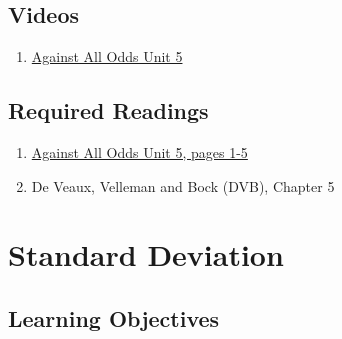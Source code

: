 \documentclass[letterpaper,12pt,twoside,printwatermark=false]{pinp}
\providecommand{\tightlist}{%
  \setlength{\itemsep}{0pt}\setlength{\parskip}{0pt}}
\begin{document}
\hypertarget{videos}{%
\subsection{Videos}\label{videos}}

\begin{enumerate}
\def\labelenumi{\arabic{enumi}.}
\tightlist
\item
  \href{https://www.learner.org/courses/againstallodds/unitpages/unit05.html}{Against
  All Odds Unit 5}
\end{enumerate}

\hypertarget{required-readings}{%
\subsection{Required Readings}\label{required-readings}}

\begin{enumerate}
\def\labelenumi{\arabic{enumi}.}
\tightlist
\item
  \href{https://www.learner.org/courses/againstallodds/pdfs/AgainstAllOdds_StudentGuide_Unit05.pdf\#page=1}{Against
  All Odds Unit 5, pages 1-5}
\item
  De Veaux, Velleman and Bock (DVB), Chapter 5
\end{enumerate}

\vspace*{0.25cm}

\hypertarget{standard-deviation}{%
\section{Standard Deviation}\label{standard-deviation}}

\hypertarget{learning-objectives-1}{%
\subsection{Learning Objectives}\label{learning-objectives-1}}
\end{document}
